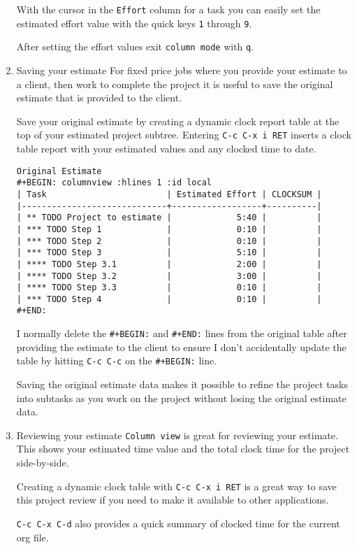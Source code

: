 \documentclass[11pt]{scrartcl}
\begin{document}
\begin{enumerate}
With the cursor in the \texttt{Effort} column for a task you can easily set
the estimated effort value with the quick keys \texttt{1} through \texttt{9}.

After setting the effort values exit \texttt{column mode} with \texttt{q}.
\item Saving your estimate
\label{sec:orgheadline25}
For fixed price jobs where you provide your estimate to a client, then
work to complete the project it is useful to save the original
estimate that is provided to the client.

Save your original estimate by creating a dynamic clock report table
at the top of your estimated project subtree.  Entering \texttt{C-c C-x i
RET} inserts a clock table report with your estimated values and any
clocked time to date.

\begin{verbatim}
Original Estimate
#+BEGIN: columnview :hlines 1 :id local
| Task                        | Estimated Effort | CLOCKSUM |
|-----------------------------+------------------+----------|
| ** TODO Project to estimate |             5:40 |          |
| *** TODO Step 1             |             0:10 |          |
| *** TODO Step 2             |             0:10 |          |
| *** TODO Step 3             |             5:10 |          |
| **** TODO Step 3.1          |             2:00 |          |
| **** TODO Step 3.2          |             3:00 |          |
| **** TODO Step 3.3          |             0:10 |          |
| *** TODO Step 4             |             0:10 |          |
#+END:
\end{verbatim}
I normally delete the \texttt{\#+BEGIN:} and \texttt{\#+END:} lines from the original
table after providing the estimate to the client to ensure I don't
accidentally update the table by hitting \texttt{C-c C-c} on the \texttt{\#+BEGIN:}
line.

Saving the original estimate data makes it possible to refine the
project tasks into subtasks as you work on the project without losing
the original estimate data.
\item Reviewing your estimate
\label{sec:orgheadline26}
\texttt{Column view} is great for reviewing your estimate.  This shows your
estimated time value and the total clock time for the project
side-by-side.

Creating a dynamic clock table with \texttt{C-c C-x i RET} is a great way to
save this project review if you need to make it available to other
applications.

\texttt{C-c C-x C-d} also provides a quick summary of clocked time for the
current org file.
\end{enumerate}
\end{document}
